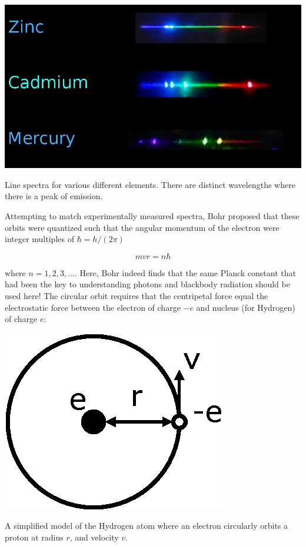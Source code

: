 \begin{marginfigure}[-7cm]
	\includegraphics{images/line_spectra.png}
	\caption{Line spectra for various different elements. There are distinct wavelengths where there is a peak of emission. } 
\end{marginfigure}

Attempting to match experimentally measured spectra, Bohr proposed that these orbits were quantized such that the angular momentum of the electron were integer multiples of $\hbar = h/(2\pi) $

\begin{equation}
	mvr = n\hbar \label{eq: quant}
	\end{equation}

where $n = 1,2,3,... $. Here, Bohr indeed finds that the same Planck constant that had been the key to understanding photons and blackbody radiation should be used here! The circular orbit requires that the centripetal force equal the electrostatic force between the electron of charge $ -e$ and nucleus (for Hydrogen) of charge $ e $:

\begin{marginfigure}[0cm]
	\includegraphics{images/chap1_atom_model.eps}
	\caption{A simplified model of the Hydrogen atom where an electron circularly orbits a proton at radius $ r $, and velocity $ v $.} 
\end{marginfigure}

